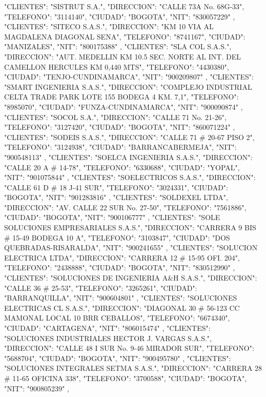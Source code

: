    {
   "CLIENTES": "SISTRUT S.A.",
   "DIRECCION": "CALLE 73A No. 68G-33",
   "TELEFONO": "3114140",
   "CIUDAD": "BOGOTA",
   "NIT": "830057229"
   },
   {
   "CLIENTES": "SITECO S.A.S.",
   "DIRECCION": "KM 10 VIA AL MAGDALENA DIAGONAL SENA",
   "TELEFONO": "8741167",
   "CIUDAD": "MANIZALES",
   "NIT": "800175388"
   },
   {
   "CLIENTES": "SLA COL S.A.S.",
   "DIRECCION": "AUT. MEDELLIN KM 10.5 SEC. NORTE AL INT. DEL CAMELLON HERCULES KM 0,440 MTS",
   "TELEFONO": "4430380",
   "CIUDAD": "TENJO-CUNDINAMARCA",
   "NIT": "900209807"
   },
   {
   "CLIENTES": "SMART INGENIERIA S.A.S.",
   "DIRECCION": "COMPLEJO INDUSTRIAL CELTA TRADE PARK LOTE 155 BODEGA 4 KM. 7,1",
   "TELEFONO": "8985070",
   "CIUDAD": "FUNZA-CUNDINAMARCA",
   "NIT": "900090874"
   },
   {
   "CLIENTES": "SOCOL S.A.",
   "DIRECCION": "CALLE 71 No. 21-26",
   "TELEFONO": "3127420",
   "CIUDAD": "BOGOTA",
   "NIT": "860071224"
   },
   {
   "CLIENTES": "SODEIS S.A.S.",
   "DIRECCION": "CALLE 71 # 20-67 PISO 2",
   "TELEFONO": "3124938",
   "CIUDAD": "BARRANCABERMEJA",
   "NIT": "900548113"
   },
   {
   "CLIENTES": "SOELCA INGENIERIA S.A.S.",
   "DIRECCION": "CALLE 20 A # 14-78",
   "TELEFONO": "6330688",
   "CIUDAD": "YOPAL",
   "NIT": "901075844"
   },
   {
   "CLIENTES": "SOELECTRICOS S.A.S.",
   "DIRECCION": "CALLE 61 D # 18 J-41 SUR",
   "TELEFONO": "3024331",
   "CIUDAD": "BOGOTA",
   "NIT": "901283816"
   },
   {
   "CLIENTES": "SOLDEXEL LTDA",
   "DIRECCION": "AV. CALLE 22 SUR No. 27-50",
   "TELEFONO": "7561886",
   "CIUDAD": "BOGOTA",
   "NIT": "900106777"
   },
   {
   "CLIENTES": "SOLE SOLUCIONES EMPRESARIALES S.A.S.",
   "DIRECCION": "CARRERA 9 BIS # 15-49 BODEGA 10 A",
   "TELEFONO": "3103847",
   "CIUDAD": "DOS QUEBRADAS-RISARALDA",
   "NIT": "900241655"
   },
   {
   "CLIENTES": "SOLUCION ELECTRICA LTDA",
   "DIRECCION": "CARRERA 12 # 15-95 OFI. 204",
   "TELEFONO": "2438888",
   "CIUDAD": "BOGOTA",
   "NIT": "830512990"
   },
   {
   "CLIENTES": "SOLUCIONES DE INGENIERIA A&H S.A.S.",
   "DIRECCION": "CALLE 36 # 25-53",
   "TELEFONO": "3265261",
   "CIUDAD": "BARRANQUILLA",
   "NIT": "900604801"
   },
   {
   "CLIENTES": "SOLUCIONES ELECTRICAS CL S.A.S.",
   "DIRECCION": "DIAGONAL 30 # 56-123 CC MAMONAL LOCAL 10 BRR CEBALLOS",
   "TELEFONO": "6674340",
   "CIUDAD": "CARTAGENA",
   "NIT": "806015474"
   },
   {
   "CLIENTES": "SOLUCIONES INDUSTRIALES HECTOR J. VARGAS S.A.S.",
   "DIRECCION": "CALLE 48 I SUR No. 9-46 MIRADOR SUR",
   "TELEFONO": "5688704",
   "CIUDAD": "BOGOTA",
   "NIT": "900495780"
   },
   {
   "CLIENTES": "SOLUCIONES INTEGRALES SETMA S.A.S.",
   "DIRECCION": "CARRERA 28 # 11-65 OFICINA 338",
   "TELEFONO": "3700588",
   "CIUDAD": "BOGOTA",
   "NIT": "900805239"
   },
